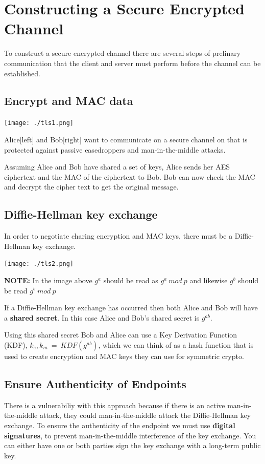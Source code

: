\documentclass[11pt]{article} %
\begin{document}
\section{Constructing a Secure Encrypted Channel}
To construct a secure encrypted channel there are several steps of prelinary
communication that the client and server must perform before the channel can be
established.

\subsection{Encrypt and MAC data}

\texttt{[image: ./tls1.png]}

{\parindent0pt Alice[left] and Bob[right] want to communicate on a secure 
channel on that is protected against passive easedroppers and man-in-the-middle
attacks.}

\bigskip
{\parindent0pt Assuming Alice and Bob have shared a set of keys, Alice sends her
AES ciphertext and the MAC of the ciphertext to Bob.  Bob can now check the MAC
and decrypt the cipher text to get the original message.}

\newpage
\subsection{Diffie-Hellman key exchange}
In order to negotiate charing encryption and MAC keys, there must be a
Diffie-Hellman key exchange.

\texttt{[image: ./tls2.png]}

{\parindent0pt \textbf{NOTE:} In the image above $g^{a}$  should be read as 
$g^{a}\ mod\ p$ and likewise $g^{b}$ should be read $g^{b}\ mod\ p$}

\bigskip
{\parindent0pt If a Diffie-Hellman key exchange has occurred then both Alice 
and Bob will have a \textbf{shared secret}. In this case Alice and Bob's shared
secret is $g^{ab}$.}

\bigskip
{\parindent0pt Using this shared secret Bob and Alice can use a Key Derivation
Function (KDF), 
\smallskip
$k_e, k_m\ =\ KDF(g^{ab})$, which we can think of as a hash function that is 
used to create encryption and MAC keys they can use for symmetric crypto.}

\newpage
\subsection{Ensure Authenticity of Endpoints}
There is a vulnerabiliy with this approach because if there is an active
man-in-the-middle attack, they could man-in-the-middle attack the Diffie-Hellman
key exchange.  To ensure the authenticity of the endpoint we must use
\textbf{digital signatures}, to prevent man-in-the-middle interference of the
key exchange.
\smallskip
You can either have one or both parties sign the key exchange with a long-term
public key.
\end{document}
